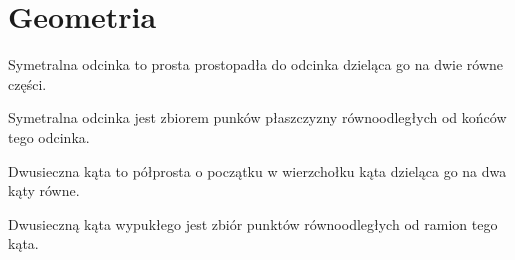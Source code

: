   \chapter{Geometria}
    \begin{definition}
      Symetralna odcinka to prosta prostopadła do odcinka dzieląca go na dwie równe części.
    \end{definition}
    \begin{theorem}
      Symetralna odcinka jest zbiorem punków płaszczyzny równoodległych od końców tego odcinka.
    \end{theorem}
    \begin{definition}
      Dwusieczna kąta to półprosta o początku w wierzchołku kąta dzieląca go na dwa kąty równe.
    \end{definition}
    \begin{theorem}
      Dwusieczną kąta wypukłego jest zbiór punktów równoodległych od ramion tego kąta.
    \end{theorem}
    \begin{center}
    \end{center}
